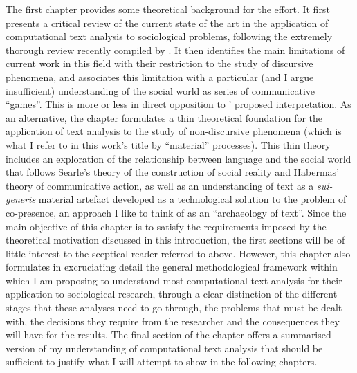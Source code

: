 The first chapter provides some theoretical background for the effort.
It first presents a critical review of the current state of the art in the application of computational text analysis to sociological problems, following the extremely thorough review recently compiled by \citet{evans2016}.
It then identifies the main limitations of current work in this field with their restriction to the study of discursive phenomena, and associates this limitation with a particular (and I argue insufficient) understanding of the social world as series of communicative ``games''. This is more or less in direct opposition to \citeauthor{evans2016}' proposed interpretation.
As an alternative, the chapter formulates a thin theoretical foundation for the application of text analysis to the study of non-discursive phenomena (which is what I refer to in this work's title by ``material'' processes).
This thin theory includes an exploration of the relationship between language and the social world that follows Searle's theory of the construction of social reality and Habermas' theory of communicative action, as well as an understanding of text as a \emph{sui-generis} material artefact developed as a technological solution to the problem of co-presence, an approach I like to think of as an ``archaeology of text''.
Since the main objective of this chapter is to satisfy the requirements imposed by the theoretical motivation discussed in this introduction, the first sections will be of little interest to the sceptical reader referred to above.
However, this chapter also formulates in excruciating detail the general methodological framework within which I am proposing to understand most computational text analysis for their application to sociological research, through a clear distinction of the different stages that these analyses need to go through, the problems that must be dealt with, the decisions they require from the researcher and the consequences they will have for the results.
The final section of the chapter offers a summarised version of my understanding of computational text analysis that should be sufficient to justify what I will attempt to show in the following chapters.

